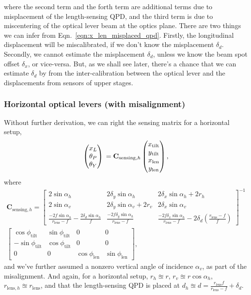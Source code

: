 where the second term and the forth term are additional terms due to misplacement of the length-sensing QPD, and the third term is due to miscentering of the optical lever beam at the optics plane.
There are two things we can infer from Eqn.~\ref{eqn:x_len_misplaced_qpd}.
Firstly, the longitudinal displacement will be miscalibrated, if we don't know the misplacement $\delta_d$.
Secondly, we cannot estimate the misplacement $\delta_d$, unless we know the beam spot offset $\delta_x$, or vice-versa.
But, as we shall see later, there's a chance that we can estimate $\delta_d$ by from the inter-calibration between the optical lever and the displacements from sensors of upper stages.

\subsubsection{Horizontal optical levers (with misalignment)}
Without further derivation, we can right the sensing matrix for a horizontal setup,
\begin{equation}
	\begin{pmatrix}
		x_L\\
		\theta_P\\
		\theta_Y
	\end{pmatrix}\\
	=
	\mathbf{C}_{\mathrm{sensing},h}
	\begin{pmatrix}
		x_\mathrm{tilt}\\
		y_\mathrm{tilt}\\
		x_\mathrm{len}\\
		y_\mathrm{len}
	\end{pmatrix},
\end{equation}
where
\begin{multline}
	\mathbf{C}_{\mathrm{sensing},h}=
	\begin{bmatrix}
		2\sin\alpha_h & 2\delta_y\sin\alpha_h & 2\delta_x\sin\alpha_h + 2r_h\\
		2\sin\alpha_v & 2\delta_y\sin\alpha_v + 2r_v & 2\delta_x\sin\alpha_v\\
		\frac{-2f\sin\alpha_h}{r_\mathrm{lens}-f} - \frac{2\delta_d\sin\alpha_h}{f} & \frac{-2f\delta_y\sin\alpha_h}{r_\mathrm{lens}-f} & \frac{-2f\delta_x\sin\alpha_h}{r_\mathrm{lens}-f} - 2\delta_d\left(\frac{r_\mathrm{lens}-f}{f}\right)
	\end{bmatrix}^{-1}\\
	\begin{bmatrix}
		\cos\phi_\mathrm{tilt} & \sin\phi_\mathrm{tilt} & 0 & 0\\
		-\sin\phi_\mathrm{tilt} & \cos\phi_\mathrm{tilt} & 0 & 0\\
		0 & 0 & \cos\phi_\mathrm{len} & \sin\phi_\mathrm{len}
	\end{bmatrix},
	\label{eqn:sensing_matrix_misaling_horizontal}
\end{multline}
and we've further assumed a nonzero vertical angle of incidence $\alpha_v$, as part of the misalignment.
And again, for a horizontal setup, $r_h\approxeq r$, $r_v\approxeq r\cos\alpha_h$, $r_{\mathrm{lens},h}\approxeq r_\mathrm{lens}$, and that the length-sensing QPD is placed at $d_h \approxeq d = \frac{r_\mathrm{lens}f}{r_\mathrm{lens}-f}+\delta_d$.

